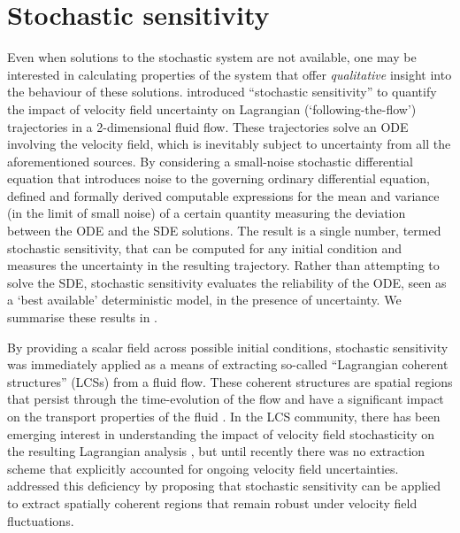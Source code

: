 \section{Stochastic sensitivity}
Even when solutions to the stochastic system are not available, one may be interested in calculating properties of the system that offer \emph{qualitative} insight into the behaviour of these solutions.
\citet{Balasuriya_2020_StochasticSensitivityComputable} introduced ``stochastic sensitivity'' to quantify the impact of velocity field uncertainty on Lagrangian (`following-the-flow') trajectories in a 2-dimensional fluid flow.
These trajectories solve an ODE involving the velocity field, which is inevitably subject to uncertainty from all the aforementioned sources.
By considering a small-noise stochastic differential equation that introduces noise to the governing ordinary differential equation, \citet{Balasuriya_2020_StochasticSensitivityComputable} defined and formally derived computable expressions for the mean and variance (in the limit of small noise) of a certain quantity measuring the deviation between the ODE and the SDE solutions.
The result is a single number, termed stochastic sensitivity, that can be computed for any initial condition and measures the uncertainty in the resulting trajectory.
Rather than attempting to solve the SDE, stochastic sensitivity evaluates the reliability of the ODE, seen as a `best available' deterministic model, in the presence of uncertainty.
We summarise these results in .

By providing a scalar field across possible initial conditions, stochastic sensitivity was immediately applied as a means of extracting so-called ``Lagrangian coherent structures'' (LCSs) from a fluid flow.
These coherent structures are spatial regions that persist through the time-evolution of the flow and have a significant impact on the transport properties of the fluid \citep{BalasuriyaEtAl_2018_GeneralizedLagrangianCoherent,HadjighasemEtAl_2017_CriticalComparisonLagrangian,PeacockDabiri_2010_IntroductionFocusIssue}.
In the LCS community, there has been emerging interest in understanding the impact of velocity field stochasticity on the resulting Lagrangian analysis \citep{DennerEtAl_2016_ComputingCoherentSets,YouLeung_2021_ComputingFiniteTime,Balasuriya_2020_StochasticApproachesLagrangian,HallerEtAl_2018_MaterialBarriersDiffusive,BalasuriyaGottwald_2018_EstimatingStableUnstable,Balasuriya_2017_StochasticUncertaintyAdvected}, but until recently there was no extraction scheme that explicitly accounted for ongoing velocity field uncertainties.
\citet{Balasuriya_2020_StochasticSensitivityComputable} addressed this deficiency by proposing that stochastic sensitivity can be applied to extract spatially coherent regions that remain robust under velocity field fluctuations.

